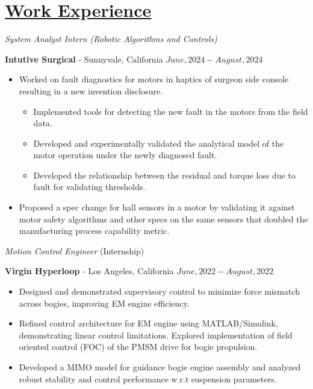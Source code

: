 \section*{\underline{Work Experience}}
\noindent \textit{System Analyst Intern (Robotic Algorithms and Controls)}

\textbf{Intutive Surgical} - Sunnyvale, California \hfill $June, 2024  - August, 2024$

\begin{itemize}
        \item Worked on fault diagnostics for motors in haptics of surgeon side console resulting in a new invention disclosure.
        \begin{itemize}
                \item Implemented tools for detecting the new fault in the motors from the field data.
                \item Developed and experimentally validated the analytical model of the motor operation under the newly diagnosed fault.
                \item Developed the relationship between the residual and torque loss due to fault for validating thresholds.
        \end{itemize}
        \item Proposed a spec change for hall sensors in a motor by validating it against motor safety algorithms and other specs on the same sensors that doubled the manufacturing process capability metric.
\end{itemize}

\medskip


\noindent \textit{Motion Control Engineer } (Internship)

\textbf{Virgin Hyperloop} - Los Angeles, California \hfill $June, 2022  - August, 2022$

\begin{itemize}
        \item Designed and demonstrated supervisory control to minimize force mismatch across bogies, improving EM engine efficiency.
        \item Refined control architecture for EM engine using MATLAB/Simulink, demonstrating linear control limitations. Explored implementation of field oriented control (FOC) of the PMSM drive for bogie propulsion.
        \item Developed a MIMO model for guidance bogie engine assembly and analyzed robust stability and control performance w.r.t suspension parameters.
\end{itemize}


